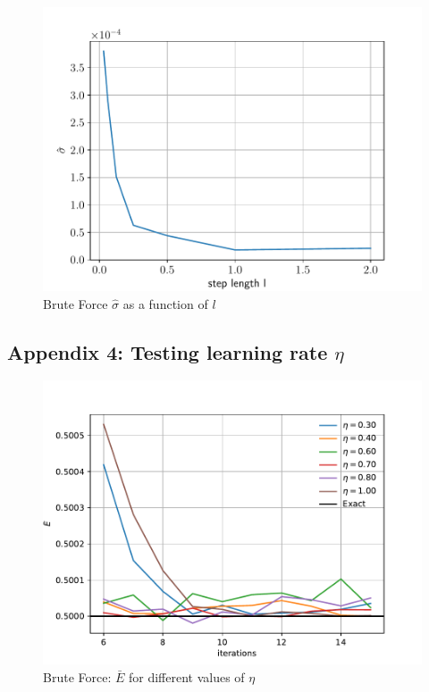 \documentclass[%
oneside,                 %
final,                   %
10pt]{article}
\begin{document}
\begin{appendices}
\begin{figure}[!h]
        \centering 
         \includegraphics[scale=0.6]{../Results/sim_3/error.pdf} 
        \caption{Brute Force $\hat \sigma$ as a function of $l$}
        \label{fig:app_4_BF}   
\end{figure}  

\subsection{Appendix 4: Testing learning rate $\eta$}
\begin{figure}[!h]
        \centering 
         \includegraphics[scale=0.6]{../Results/sim_4/BF_eta.pdf} 
        \caption{Brute Force: $\bar E$ for different values of $\eta$ }
        \label{fig:training_BF}   
\end{figure}  


\end{appendices}
\end{document}
